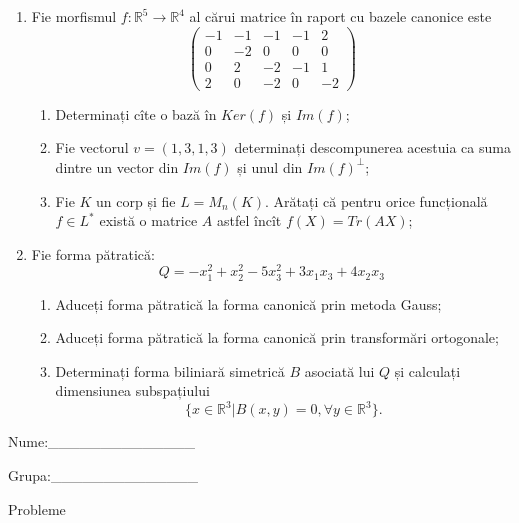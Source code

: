 \documentclass{article}
\begin{document}
\begin{enumerate}
 \item Fie morfismul $f:\mathbb{R}^5 \to \mathbb{R}^4$ al cărui matrice în raport cu bazele canonice este
$$\begin{pmatrix}
-1&-1&-1&-1&2\\
0&-2&0&0&0\\
0&2&-2&-1&1\\
2&0&-2&0&-2
\end{pmatrix}$$

\begin{enumerate}
\item Determinați cîte o bază în $Ker(f)$ și $Im(f)$;
\item Fie vectorul $v=(1,3,1,3)$ determinați descompunerea acestuia ca suma dintre un vector din $Im(f)$ și unul din $Im(f)^\perp$;
\item Fie $K$ un corp și fie $L=M_n(K)$. Arătați că pentru orice funcțională $f \in L^*$ există o matrice $A$ astfel încît $f(X)=Tr(AX)$;
\end{enumerate}
\item Fie forma pătratică:
$$Q= -x_1^2+x_2^2-5x_3^2+3x_1x_3+4x_2x_3$$

\begin{enumerate}
\item Aduceți forma pătratică la forma canonică prin metoda Gauss;
\item Aduceți forma pătratică la forma canonică prin transformări ortogonale;
\item Determinați forma biliniară simetrică $B$ asociată lui $Q$ și calculați dimensiunea subspațiului
$$\{x \in \mathbb{R}^3 | B(x,y)=0,\forall y \in \mathbb{R}^3\}.$$

\end{enumerate}
\end{enumerate}
\newpage
\begin{flushright}
Nume:\_\_\_\_\_\_\_\_\_\_\_\_\_\_
 
 
Grupa:\_\_\_\_\_\_\_\_\_\_\_\_\_\_
\end{flushright}
\begin{center}
\vspace{2cm}
{\Large Probleme}
\vspace{2cm}
\end{center}
\end{document}
